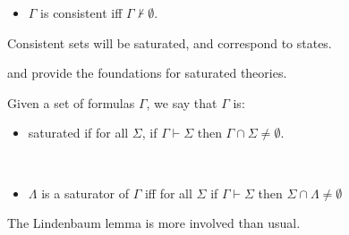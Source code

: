\documentclass[10pt]{article}
\begin{document}
\begin{definition}[Consistency]
  \begin{itemize}
  \item \(\Gamma\) is consistent iff \(\Gamma \nvdash \emptyset\).
  \end{itemize}
\end{definition}

Consistent sets will be saturated, and correspond to states.

\textcite{Thomason:1968aa} and \textcite{Aczel:1968aa} provide the foundations for saturated theories.

\begin{definition}[Saturation]
  Given a set of formulas \(\Gamma\), we say that \(\Gamma\) is:
  \begin{itemize}
  \item saturated if for all \(\Sigma\), if \(\Gamma \vdash \Sigma\) then \(\Gamma \cap \Sigma \ne \emptyset\).
  \end{itemize}
\end{definition}

\begin{definition}[Saturators]
  \mbox{ }
  \begin{itemize}
  \item \(\Lambda\) is a saturator of \(\Gamma\) iff for all \(\Sigma\) if \(\Gamma \vdash \Sigma\) then \(\Sigma \cap \Lambda \ne \emptyset\)
  \end{itemize}
\end{definition}


The Lindenbaum lemma is more involved than usual.
\end{document}

